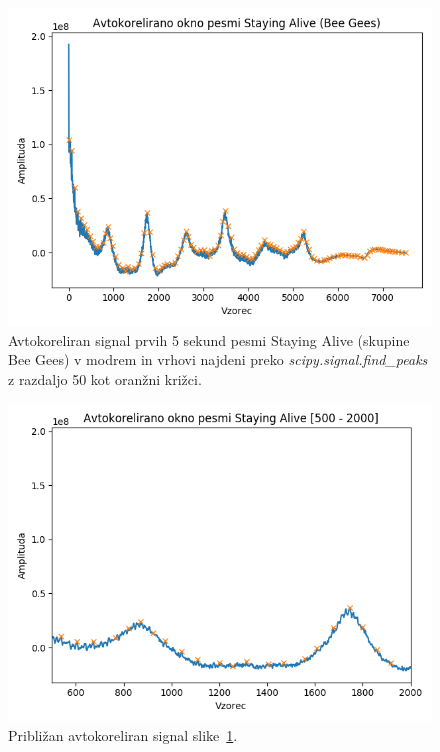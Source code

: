 \documentclass[a4paper,11pt]{article}
\begin{document}
\begin{figure}[htbp]
\begin{center}
\includegraphics[scale=0.5]{images/sa_win0_dist50_peaks.png}
\caption{Avtokoreliran signal prvih 5 sekund pesmi Staying Alive (skupine Bee Gees) v modrem in vrhovi najdeni preko \textit{scipy.signal.find\_peaks} z razdaljo 50 kot oranžni križci.}
\label{peaks1}
\end{center}
\end{figure}

\begin{figure}[htbp]
\begin{center}
\includegraphics[scale=0.5]{images/sa_win0_dist50_peaks_zoom.png}
\caption{Približan avtokoreliran signal slike~\ref{peaks1}.}
\label{peaks1_zoom}
\end{center}
\end{figure}
\end{document}
